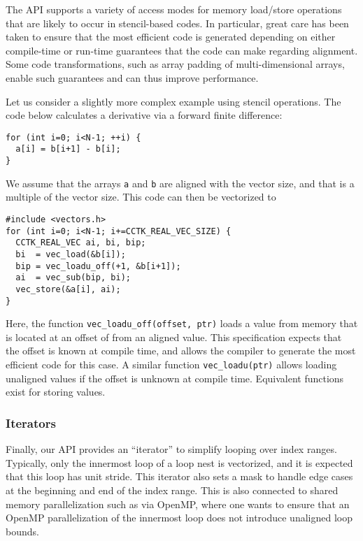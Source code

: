 \documentclass[conference]{IEEEtran}
\begin{document}
The API supports a variety of access modes for memory load/store
operations that are likely to occur in
stencil-based codes. In particular, great care has been taken to
ensure that the most efficient code is generated depending on either
compile-time or run-time guarantees that the code can make regarding
alignment. Some code transformations, such as array padding of
multi-dimensional arrays, enable such guarantees and can thus improve
performance.

Let us consider a slightly more complex example using stencil
operations. The code below calculates a derivative via a forward
finite difference:

\begin{small}
\begin{verbatim}
for (int i=0; i<N-1; ++i) {
  a[i] = b[i+1] - b[i];
}
\end{verbatim}
\end{small}

\noindent We assume that the arrays \verb+a+ and \verb+b+ are aligned
with the vector size, and that  is a multiple of the vector size.
This code can then be vectorized to

\begin{small}
\begin{verbatim}
#include <vectors.h>
for (int i=0; i<N-1; i+=CCTK_REAL_VEC_SIZE) {
  CCTK_REAL_VEC ai, bi, bip;
  bi  = vec_load(&b[i]);
  bip = vec_loadu_off(+1, &b[i+1]);
  ai  = vec_sub(bip, bi);
  vec_store(&a[i], ai);
}
\end{verbatim}
\end{small}

\noindent Here, the function \verb+vec_loadu_off(offset, ptr)+ loads a
value from memory that is located at an offset of  from an aligned
value. This specification expects that the offset is known at compile
time, and allows the compiler to generate the most efficient code for
this case. A similar function \verb+vec_loadu(ptr)+ allows loading
unaligned values if the offset is unknown at compile time. Equivalent
functions exist for storing values.

\subsubsection{Iterators}

Finally, our API provides an
``iterator'' to simplify looping over index ranges. Typically, only
the innermost loop of a loop nest is vectorized, and it is expected
that this loop has unit stride. This iterator also sets a mask to
handle edge cases at the beginning and end of the index range.
This is also connected to shared memory parallelization such as via
OpenMP, where one wants to ensure that an OpenMP parallelization of
the innermost loop does not introduce unaligned loop bounds.
\end{document}
